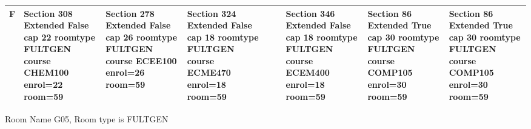 \documentclass{article} \usepackage[margin=0.5in]{geometry}
\newcommand{\textgr}[1]{\cellcolor{gray!40}\textbf{#1}}
\begin{document}
\begin{tabular}{|c|z|z|z|z|z|z|z|z|}
\hline
\textgr{F} &  Section 308 Extended False cap 22 roomtype FULTGEN course CHEM100 enrol=22 room=59 & Section 278 Extended False cap 26 roomtype FULTGEN course ECEE100 enrol=26 room=59 & Section 324 Extended False cap 18 roomtype FULTGEN course ECME470 enrol=18 room=59 &  &  & Section 346 Extended False cap 18 roomtype FULTGEN course ECEM400 enrol=18 room=59 & Section 86 Extended True cap 30 roomtype FULTGEN course COMP105 enrol=30 room=59 & Section 86 Extended True cap 30 roomtype FULTGEN course COMP105 enrol=30 room=59 \\[65pt]
\hline
\end{tabular}

	
Room Name G05, Room type is FULTGEN 
\newpage
	
\end{document}
